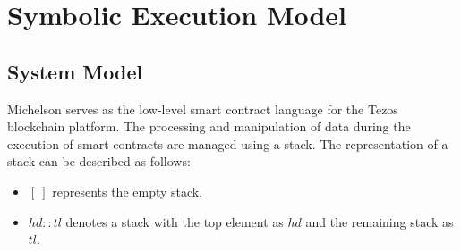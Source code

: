 \documentclass[a4paper,UKenglish,cleveref, autoref, thm-restate]{lipics-v2021}
\begin{document}
\section{Symbolic Execution Model}
\label{sec:symbolic-execution-model}
\subsection{System Model}
Michelson serves as the low-level smart contract language for the Tezos blockchain platform. The processing and manipulation of data during the execution of smart contracts are managed using a stack. The representation of a stack can be described as follows:
\begin{itemize}
\item[]  \ensuremath{[\ ]} represents the empty stack.
\item[]  \ensuremath{hd :: tl} denotes a stack with the top element as \ensuremath{hd} and the remaining stack as \ensuremath{tl}.
\end{itemize}
\end{document}
